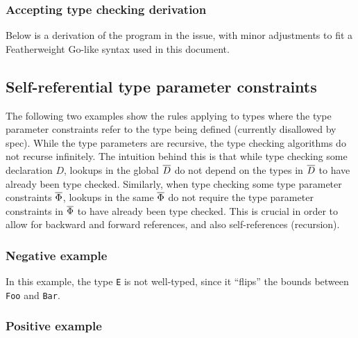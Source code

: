 \documentclass[12pt]{article}
\begin{document}
\subsubsection{Accepting type checking derivation}


\noindent
Below is a derivation of the program in the issue, with minor adjustments to
fit a Featherweight Go-like syntax used in this document.




\subsection{Self-referential type parameter constraints}

The following two examples show the rules applying to types where the type
parameter constraints refer to the type being defined (currently disallowed by
spec). While the type parameters are recursive, the type checking algorithms do
not recurse infinitely. The intuition behind this is that while type checking
some declaration $D$, lookups in the global $\overline{D}$ do not depend on the types
in $\overline{D}$ to have already been type checked. Similarly, when type checking
some type parameter constraints $\overline{\Phi}$, lookups in the same $\overline{\Phi}$ do
not require the type parameter constraints in $\overline{\Phi}$ to have already been
type checked. This is crucial in order to allow for backward and forward
references, and also self-references (recursion).

\subsubsection{Negative example}

In this example, the type \texttt{E} is not well-typed, since it ``flips'' the
bounds between \texttt{Foo} and \texttt{Bar}.





\subsubsection{Positive example}
\end{document}
